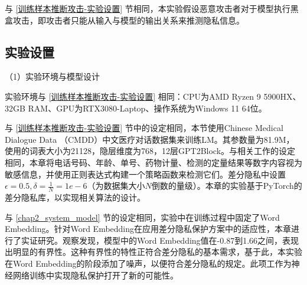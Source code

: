 %
%

与 \ref{训练样本推断攻击-实验设置} 节相同，本实验假设恶意攻击者对于模型执行黑盒攻击，即攻击者只能从输入与模型的输出关系来推测隐私信息。

\subsection{实验设置} \label{Chap5_Exp_Setting}

（1）实验环境与模型设计

实验环境与 \ref{训练样本推断攻击-实验设置} 相同：CPU为AMD Ryzen 9 5900HX、32GB RAM、GPU为RTX3080-Laptop、操作系统为Windows 11 64位。

与 \ref{训练样本推断攻击-实验设置} 节中的设定相同，本节使用Chinese Medical Dialogue Data （CMDD）中文医疗对话数据集来训练LM。其参数量为81.9M，使用的词表大小为21128，隐层维度为768，12层GPT2Block。与相关工作的设定相同\cite{selectivedp}，本章将电话号码、年龄、单号、药物计量、检测的定量结果等数字内容视为敏感信息，并使用正则表达式构建一个策略函数来检测它们。差分隐私中设置$\epsilon=0.5,\delta=\frac{1}{N}=1e-6$（为数据集大小$N$倒数的量级）。本章的实验基于PyTorch的差分隐私库\cite{opacus}，以实现相关算法的设计。


与 \ref{chap2_system_model} 节的设定相同，实验中在训练过程中固定了Word Embedding。针对Word Embedding在应用差分隐私保护方案中的适应性，本章进行了实证研究。观察发现，模型中的Word Embedding值在-0.87到1.66之间，表现出明显的有界性。这种有界性的特性正符合差分隐私的基本需求，基于此，本实验在Word Embedding的阶段添加了噪声，以便符合差分隐私的规定。此项工作为神经网络训练中实现隐私保护打开了新的可能性。


